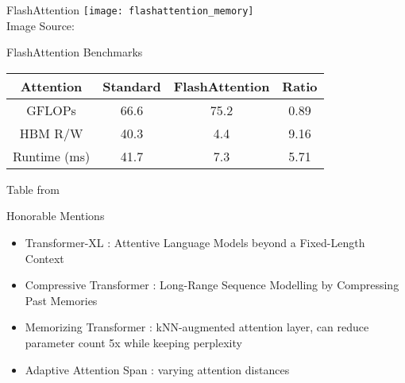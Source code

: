 \begin{frame}[c]{FlashAttention}
    \texttt{[image: flashattention\_memory]} \\
    Image Source: \cite{dao_flashattention_2022}
\end{frame}


\begin{frame}[c]{FlashAttention Benchmarks}
    \large
    \begin{tabular}{c|ccc}
        Attention & Standard & FlashAttention & Ratio \\ \hline
        GFLOPs & 66.6  & 75.2 & 0.89 \\
        HBM R/W & 40.3 & 4.4 & 9.16 \\
        Runtime (ms) & 41.7 & 7.3 & 5.71 \\
    \end{tabular} \newline \newline
    \normalsize
    Table from \cite{dao_flashattention_2022}
\end{frame}



\begin{frame}[c]{Honorable Mentions}
    \begin{itemize}[<+(1)->]
        \item Transformer-XL \cite{dai_transformerxl_2019}: Attentive Language Models beyond a Fixed-Length Context
        \item Compressive Transformer \cite{rae_compressive_2019}: Long-Range Sequence Modelling by Compressing Past Memories
        \item Memorizing Transformer \cite{wu_memorizing_2022}: kNN-augmented attention layer, can reduce parameter count 5x while keeping perplexity
        \item Adaptive Attention Span \cite{sukhbaatar_adaptive_2019}: varying attention distances
    \end{itemize}
\end{frame}
